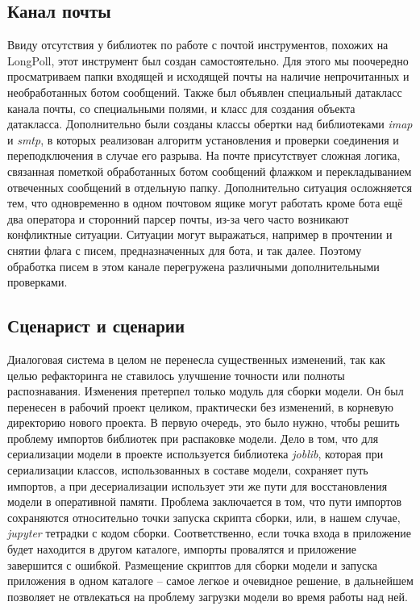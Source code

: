     \subsection{Канал почты}
    Ввиду отсутствия у библиотек по работе с почтой инструментов, похожих на LongPoll, этот инструмент был
    создан самостоятельно. Для этого мы поочередно просматриваем папки входящей и исходящей почты на наличие
    непрочитанных и необработанных ботом сообщений. Также был объявлен специальный датакласс 
    канала почты, со специальными полями, и класс  для создания объекта датакласса.
    Дополнительно были созданы классы обертки над библиотеками \textit{imap} и \textit{smtp}, в которых
    реализован алгоритм установления и проверки соединения и переподключения в случае его разрыва.
    На почте присутствует сложная логика, связанная пометкой обработанных ботом сообщений флажком
    и перекладыванием отвеченных сообщений в отдельную папку. Дополнительно ситуация осложняется тем, что
    одновременно в одном почтовом ящике могут работать кроме бота ещё два оператора и сторонний парсер почты,
    из-за чего часто возникают конфликтные ситуации. Ситуации могут выражаться, например в прочтении и снятии флага
     с писем, предназначенных для бота, и так далее. Поэтому обработка писем в этом канале перегружена
    различными дополнительными проверками.

    \subsection{Сценарист и сценарии}
    Диалоговая система в целом не перенесла существенных изменений, так как целью рефакторинга не ставилось
    улучшение точности или полноты распознавания. Изменения претерпел только модуль для сборки модели.
    Он был перенесен в рабочий проект целиком, практически без изменений, в корневую директорию нового проекта.
    В первую очередь, это было нужно, чтобы решить проблему импортов библиотек при распаковке модели.
    Дело в том, что для сериализации модели в проекте используется библиотека \textit{joblib}, которая при сериализации
    классов, использованных в составе модели, сохраняет путь импортов, а при десериализации использует эти же пути
    для восстановления модели в оперативной памяти.
    Проблема заключается в том, что пути импортов сохраняются относительно точки запуска скрипта сборки, или,
    в нашем случае, \textit{jupyter} тетрадки с кодом сборки. Соответственно, если точка входа в приложение
    будет находится в другом каталоге, импорты провалятся и приложение завершится с ошибкой.
    Размещение скриптов для сборки модели и запуска приложения в одном каталоге -- самое легкое и очевидное
    решение, в дальнейшем позволяет не отвлекаться на проблему загрузки модели во время работы над ней.

